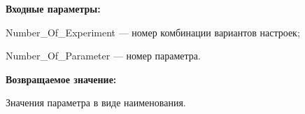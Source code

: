 \textbf{Входные параметры:}

Number\_Of\_Experiment --- номер комбинации вариантов настроек;
 
    Number\_Of\_Parameter --- номер параметра.

\textbf{Возвращаемое значение:}

Значения параметра в виде наименования.